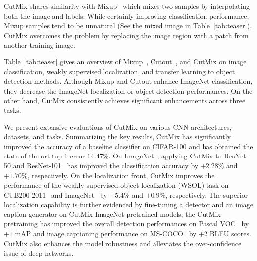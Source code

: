 CutMix shares similarity with Mixup~\cite{zhang2017mixup} which mixes two samples by interpolating both the image and labels.  
{While certainly improving classification performance, Mixup samples tend to be unnatural (See the mixed image in Table~\ref{tab:teaser}).
CutMix overcomes the problem by replacing the image region with a patch from another training image.}


Table~\ref{tab:teaser} gives an overview of Mixup~\cite{zhang2017mixup}, Cutout~\cite{devries2017cutout}, and CutMix on image classification, weakly supervised localization, and transfer learning to object detection methods.
Although Mixup and Cutout enhance ImageNet classification, they decrease the ImageNet localization or object detection performances. 
On the other hand, CutMix consistently achieves significant enhancements across three tasks.

We present extensive evaluations of CutMix on various CNN architectures, datasets, and tasks. 
Summarizing the key results, CutMix has significantly improved the accuracy of a baseline classifier on CIFAR-100 and has obtained the state-of-the-art top-1 error $14.47\%$. On ImageNet~\cite{ImageNet}, applying CutMix to ResNet-50 and ResNet-101~\cite{resnet} has improved the classification accuracy by $+2.28\%$ and $+1.70\%$, respectively. 
On the localization front, CutMix improves the performance of the weakly-supervised object localization (WSOL) task on CUB200-2011~\cite{wah2011cub} and ImageNet~\cite{ImageNet} by {$+5.4\%$} and $+0.9\%$, respectively. 
The superior localization capability is further evidenced by fine-tuning a detector and an image caption generator on CutMix-ImageNet-pretrained models; the CutMix pretraining has improved the overall detection performances on Pascal VOC~\cite{pascalvoc} by $+1$ mAP and image captioning performance on MS-COCO~\cite{lin2014microsoft} by $+2$ BLEU scores.
{CutMix also enhances the model robustness and alleviates the over-confidence issue \cite{hendrycks2016baseline, liang2017odin} of deep networks.}
